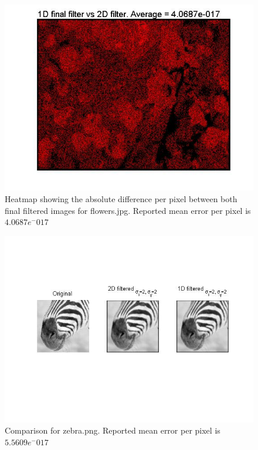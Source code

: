 \documentclass[11pt]{article}
\begin{document}
\begin{figure}[H]
	\centering
	\includegraphics[width=.9\textwidth]{imgs/flowers_heatmap.jpg}
	\caption{Heatmap showing the absolute difference per pixel between both final filtered images for flowers.jpg. Reported mean error per pixel is $4.0687 e^-017$}
	\label{fig:flowers_heatmap}
\end{figure}

\begin{figure}[H]
	\centering
	\includegraphics[width=.9\textwidth]{imgs/zebra_conv.jpg}
	\caption{Comparison for zebra.png. Reported mean error per pixel is $5.5609 e^-017$}
	\label{fig:zebra}
\end{figure}
\end{document}
